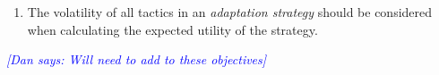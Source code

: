 \documentclass[12pt]{article}
\newcommand{\dan}[1]{\textcolor{blue}{{\it [Dan says: #1]}}}
\begin{document}
\begin{enumerate}[noitemsep]
    \item The volatility of all tactics in an \emph{adaptation strategy} should be considered when calculating the expected utility of the strategy.
    
    
    
    
        
    
    

    

    
    
    
    
    





\end{enumerate}




\dan{Will need to add to these objectives}
\end{document}
